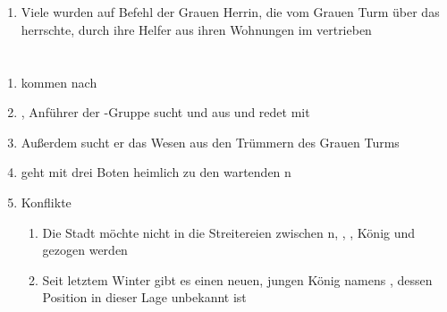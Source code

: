 \documentclass[12pt,a4paper,onecolumn,oneside,ngerman]{book}
\begin{document}
\chapter[{\Naimo} erzählt die traurige Geschichte der Grauen Herrin und wie das {\Enland} verloren wurde]{}
\begin{enumerate}
  \item Viele {\Enlaender} wurden auf Befehl der Grauen Herrin, die vom Grauen Turm über das {\Enland} herrschte, durch ihre Helfer aus ihren Wohnungen im {\Enland} vertrieben
\end{enumerate}

\chapter[Die {\Bangiri} kommen]{}
\begin{enumerate}
  \item {\Bangiri} kommen nach {\Lobarn}
  \item {\Oggo}, Anführer der {\Bangiri}-Gruppe sucht {\Enlaender} und {\Schattenlaufer} aus {\Beron} und redet mit {\Vester}
  \item Außerdem sucht er das Wesen aus den Trümmern des Grauen Turms
  \item {\Vester} geht mit drei Boten heimlich zu den wartenden {\Schattenlaufer}n
  \item Konflikte
  \begin{enumerate}
    \item Die Stadt {\Lobarn} möchte nicht in die Streitereien zwischen {\Schattenlaufer}n, {\Bangiri}, {\Garde}, König und {\Enland} gezogen werden
    \item Seit letztem Winter gibt es einen neuen, jungen König namens {\Palemus}, dessen Position in dieser Lage unbekannt ist
  \end{enumerate}
\end{enumerate}
\end{document}
